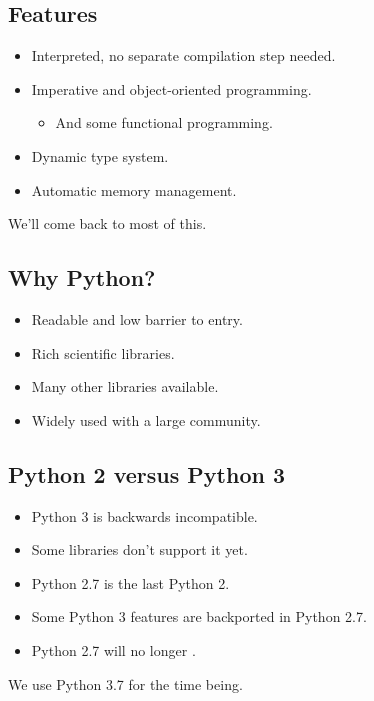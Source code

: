 \documentclass[slidestop]{beamer}
\begin{document}
\subsection{Features}
\begin{pframe}
 \begin{itemize}
  \item Interpreted, no separate compilation step needed.
  \item Imperative and object-oriented programming.
  \begin{itemize}
   \item And some functional programming.
  \end{itemize}
  \item Dynamic type system.
  \item Automatic memory management.
 \end{itemize}
 We'll come back to most of this.
\end{pframe}

\subsection{Why Python?}
\begin{pframe}
 \begin{itemize}
  \item Readable and low barrier to entry.
  \item Rich scientific libraries.
  \item Many other libraries available.
  \item Widely used with a large community.
 \end{itemize}
\end{pframe}

\subsection{Python 2 versus Python 3}
\begin{pframe}
 \begin{itemize}
  \item Python 3 is backwards incompatible.
  \item Some libraries don't support it yet.
  \item Python 2.7 is the last Python 2.
  \item Some Python 3 features are backported in Python 2.7.
  \item Python 2.7 will no longer .
 \end{itemize}
  We use Python 3.7 for the time being.
\end{pframe}
\end{document}
